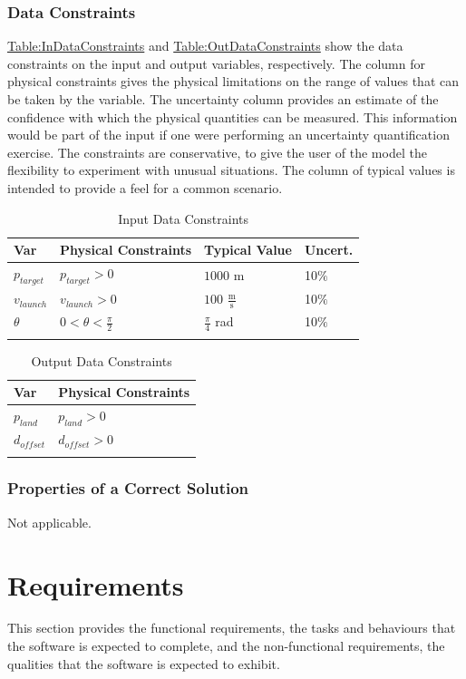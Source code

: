 \documentclass[12pt]{article}
\begin{document}
\subsubsection{Data Constraints}
\label{Sec:DataConstraints}
\hyperref[Table:InDataConstraints]{Table:InDataConstraints} and \hyperref[Table:OutDataConstraints]{Table:OutDataConstraints} show the data constraints on the input and output variables, respectively. The column for physical constraints gives the physical limitations on the range of values that can be taken by the variable. The uncertainty column provides an estimate of the confidence with which the physical quantities can be measured. This information would be part of the input if one were performing an uncertainty quantification exercise. The constraints are conservative, to give the user of the model the flexibility to experiment with unusual situations. The column of typical values is intended to provide a feel for a common scenario.
\begin{longtable}{l l l l}
\toprule
Var & Physical Constraints & Typical Value & Uncert.
\\
\midrule
\endhead
${p_{target}}$ & ${p_{target}}>0$ & $1000$ m & 10$\%$
\\
${v_{launch}}$ & ${v_{launch}}>0$ & $100$ $\frac{\text{m}}{\text{s}}$ & 10$\%$
\\
$θ$ & $0<θ<\frac{π}{2}$ & $\frac{π}{4}$ rad & 10$\%$
\\
\bottomrule
\caption{Input Data Constraints}
\label{Table:InDataConstraints}
\end{longtable}
\begin{longtable}{l l}
\toprule
Var & Physical Constraints
\\
\midrule
\endhead
${p_{land}}$ & ${p_{land}}>0$
\\
${d_{offset}}$ & ${d_{offset}}>0$
\\
\bottomrule
\caption{Output Data Constraints}
\label{Table:OutDataConstraints}
\end{longtable}
\subsubsection{Properties of a Correct Solution}
\label{Sec:CorSolProps}
Not applicable.
\section{Requirements}
\label{Sec:Requirements}
This section provides the functional requirements, the tasks and behaviours that the software is expected to complete, and the non-functional requirements, the qualities that the software is expected to exhibit.
\end{document}
